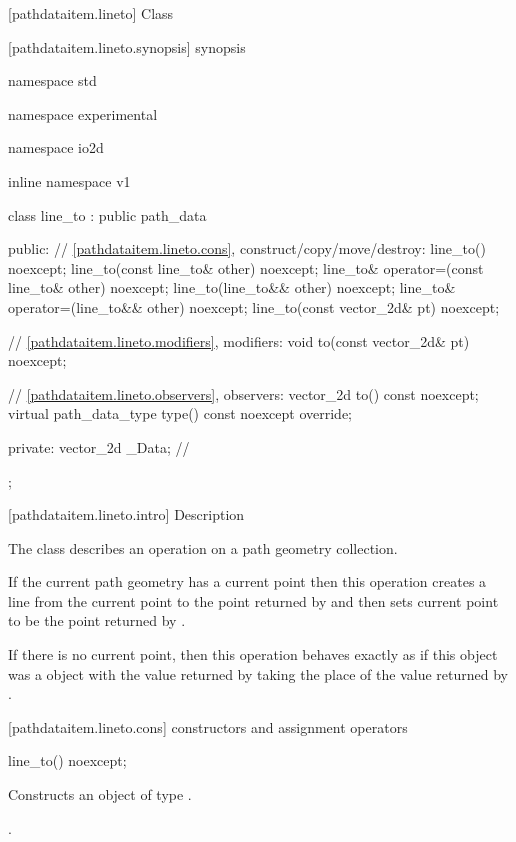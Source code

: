  [pathdataitem.lineto] {Class }

 [pathdataitem.lineto.synopsis] { synopsis}

\begin{codeblock}
namespace std { namespace experimental { namespace io2d { inline namespace v1 {
  class line_to : public path_data {
  public:
    // \ref{pathdataitem.lineto.cons}, construct/copy/move/destroy:
    line_to() noexcept;
    line_to(const line_to& other) noexcept;
    line_to& operator=(const line_to& other) noexcept;
    line_to(line_to&& other) noexcept;
    line_to& operator=(line_to&& other) noexcept;
    line_to(const vector_2d& pt) noexcept;

    // \ref{pathdataitem.lineto.modifiers}, modifiers:
    void to(const vector_2d& pt) noexcept;

    // \ref{pathdataitem.lineto.observers}, observers:
    vector_2d to() const noexcept;
    virtual path_data_type type() const noexcept override;
    
  private:
    vector_2d _Data; // \expos
  };
} } } }
\end{codeblock}

 [pathdataitem.lineto.intro] { Description}

\pnum
{}
The class  describes an operation on a path geometry collection.

\pnum
If the current path geometry has a current point then this operation creates a line from the current point to the point returned by  and then sets current point to be the point returned by .

\pnum
If there is no current point, then this operation behaves exactly as if this object was a  object with the value returned by  taking the place of the value returned by .

 [pathdataitem.lineto.cons] { constructors and assignment operators}

\begin{itemdecl}
    line_to() noexcept;
\end{itemdecl}
\begin{itemdescr}
	\pnum
	\effects
	Constructs an object of type .
	
	\pnum
	\postconditions
	.
\end{itemdescr}

